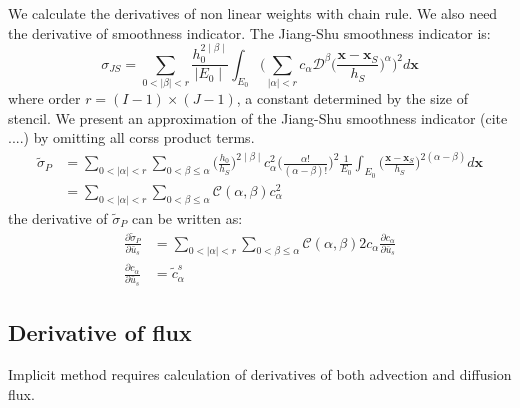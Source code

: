 \documentclass[smallextended]{svjour3}       %
\newcommand{\bfx}{{\mathbf x}}
\begin{document}
We calculate the derivatives of non linear weights with chain rule. 
We also need the derivative of smoothness indicator.
The Jiang-Shu smoothness indicator is:
\begin{equation}\label{eq:JiangShuSmoothnessInd}
		  \sigma_{JS} = \sum_{0 < \mid \beta \mid < r}\frac{h_0^{2\mid \beta \mid}}{\mid E_0 \mid} \int_{E_0} 
		  \Big ( \sum_{\mid \alpha \mid < r} c_{\alpha} \mathscr{D}^\beta \Big( \frac{\bfx - \bfx_S}{h_S}  \Big)^\alpha \Big )^2
		  d\bfx
\end{equation}
where order $r = (I-1) \times(J-1)$, a constant determined by the size of stencil.
We present an approximation of the Jiang-Shu smoothness indicator (cite ....) by 
omitting all corss product terms.
\begin{equation}\label{eq:PolynSmoothnessInd}
		  \begin{aligned}
					 \tilde \sigma_P &= \sum_{0 < \mid \alpha \mid < r} \sum_{0<\beta \leq \alpha}  
		  \Big( \frac{h_0}{h_S} \Big)^{2\mid \beta \mid} c^2_{\alpha} \Big(\frac{\alpha !}{(\alpha - \beta)!} \Big)^2
		  \frac{1}{E_0}\int_{E_0}\Big( \frac{\bfx - \bfx_S}{h_S} \Big)^{2(\alpha - \beta)}d\bfx \\
					 &= \sum_{0 < \mid \alpha \mid < r} 
					 \sum_{0<\beta\leq \alpha} \mathscr{C} (\alpha, \beta) c^2_{\alpha}
		  \end{aligned}
\end{equation}
the derivative of $\tilde \sigma_P$ can be written as:
\begin{equation}\label{eq:derivative_c_alpha}
		 \begin{aligned}
					\frac{\partial \tilde \sigma_P}{\partial \bar u_s} &=   \sum_{0 < \mid \alpha \mid < r} 
					 \sum_{0<\beta\leq \alpha} \mathscr{C} (\alpha, \beta) 2c_{\alpha}\frac{\partial c_{\alpha}}{\partial \bar u_s}\\
					 \frac{\partial c_\alpha}{\partial \bar u_s} &= \tilde c^s_{\alpha}
		 \end{aligned}
\end{equation}

\subsection{Derivative of flux}
Implicit method requires calculation of derivatives of both advection and diffusion flux.
\end{document}
